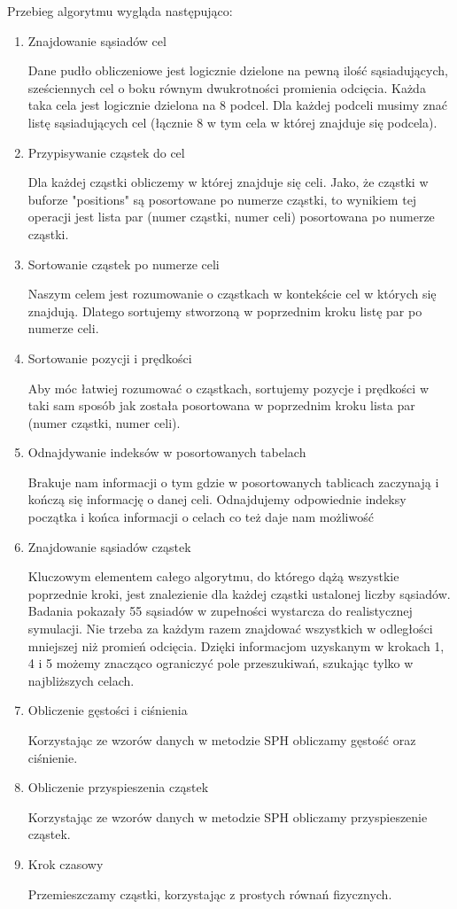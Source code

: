 \documentclass[polish, 12pt]{aghthesis}
\begin{document}
\noindent Przebieg algorytmu wygląda następująco:
			\begin{enumerate}
			\item{Znajdowanie sąsiadów cel}
			
				Dane pudło obliczeniowe jest logicznie dzielone na pewną ilość sąsiadujących, sześciennych cel o boku równym dwukrotności promienia odcięcia. Każda taka cela jest logicznie dzielona na 8 podcel. Dla każdej podceli musimy znać listę sąsiadujących cel (łącznie 8 w tym cela w której znajduje się podcela).
			\item{Przypisywanie cząstek do cel}
			
				Dla każdej cząstki obliczemy w której znajduje się celi. Jako, że cząstki w buforze "positions" są posortowane po numerze cząstki, to wynikiem tej operacji jest lista par (numer cząstki, numer celi) posortowana po numerze cząstki.
			\item{Sortowanie cząstek po numerze celi}
			
				Naszym celem jest rozumowanie o cząstkach w kontekście cel w których się znajdują. Dlatego sortujemy stworzoną w poprzednim kroku listę par po numerze celi.
			\item{Sortowanie pozycji i prędkości}
			
				Aby móc łatwiej rozumować o cząstkach, sortujemy pozycje i prędkości w taki sam sposób jak została posortowana w poprzednim kroku lista par (numer cząstki, numer celi).
			\item{Odnajdywanie indeksów w posortowanych tabelach}
			
				Brakuje nam informacji o tym gdzie w posortowanych tablicach zaczynają i kończą się informację o danej celi. Odnajdujemy odpowiednie indeksy początka i końca informacji o celach co też daje nam możliwość
				
			\item{Znajdowanie sąsiadów cząstek}
			
				Kluczowym elementem całego algorytmu, do którego dążą wszystkie poprzednie kroki, jest znalezienie dla każdej cząstki ustalonej liczby sąsiadów. Badania pokazały 55 sąsiadów w zupełności wystarcza do realistycznej symulacji. Nie trzeba za każdym razem znajdować wszystkich w odległości mniejszej niż promień odcięcia. Dzięki informacjom uzyskanym w krokach 1, 4 i 5 możemy znacząco ograniczyć pole przeszukiwań, szukając tylko w najbliższych celach.
			\item{Obliczenie gęstości i ciśnienia}
			
				Korzystając ze wzorów danych w metodzie SPH obliczamy gęstość oraz ciśnienie.
			\item{Obliczenie przyspieszenia cząstek}
			
				Korzystając ze wzorów danych w metodzie SPH obliczamy przyspieszenie cząstek.
			\item{Krok czasowy}
			
				Przemieszczamy cząstki, korzystając z prostych równań fizycznych.
				
			\end{enumerate}
		
\end{document}
